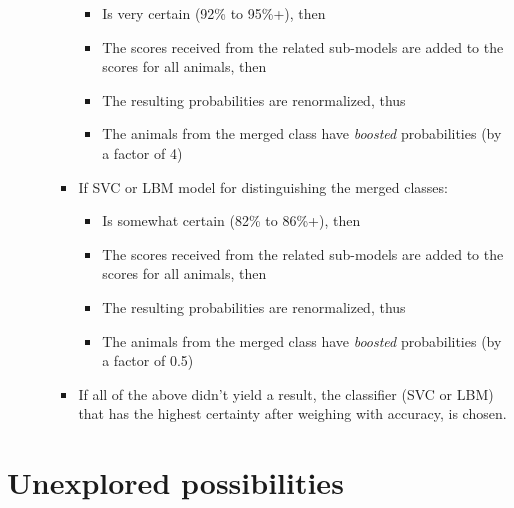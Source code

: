 \begin{itemize}
\begin{itemize}
\begin{itemize}
            \begin{itemize}
                \item Is very certain (92\% to 95\%+), then
                \item The scores received from the related sub-models are added to the scores for all animals, then
                \item The resulting probabilities are renormalized, thus
                \item The animals from the merged class have \textit{boosted} probabilities (by a factor of 4)
            \end{itemize}
            \item If SVC or LBM model for distinguishing the merged classes:
            \begin{itemize}
                \item Is somewhat certain (82\% to 86\%+), then
                \item The scores received from the related sub-models are added to the scores for all animals, then
                \item The resulting probabilities are renormalized, thus
                \item The animals from the merged class have \textit{boosted} probabilities (by a factor of 0.5)
            \end{itemize}
            \item If all of the above didn't yield a result, the classifier (SVC or LBM) that has the highest certainty after weighing with accuracy, is chosen.
        \end{itemize}
    \end{itemize}
\end{itemize}


\section{Unexplored possibilities}
\label{section:opt_unexplored}

